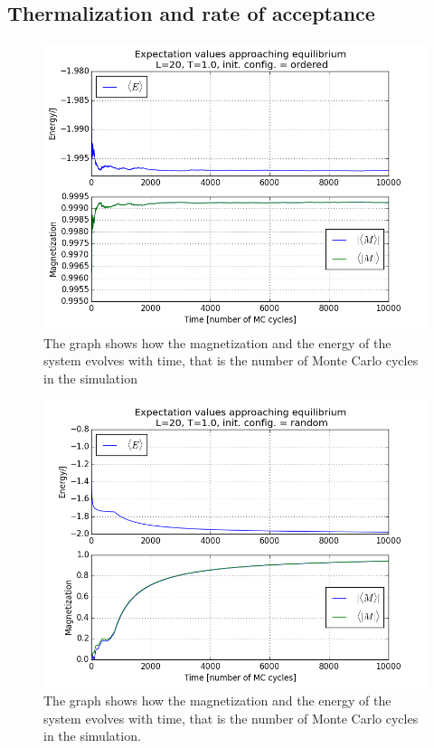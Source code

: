 \documentclass[norsk, 10pt, twocolumn, a4paper]{revtex4}
\begin{document}
\subsection{Thermalization and rate of acceptance}
\begin{figure}
    \includegraphics[width=0.9\linewidth]{c_ordered_L20t1mcE4.png}
    \caption{
        \label{fig:c1}
        The graph shows how the magnetization and the energy of the system evolves with time,
    that is the number of Monte Carlo cycles in the simulation}
\end{figure}
\begin{figure}
    \includegraphics[width=0.9\linewidth]{c_random_L20t1mcE4.png}
    \caption{
        \label{fig:c2}
        The graph shows how the magnetization and the energy of the system evolves with time,
        that is the number of Monte Carlo cycles in the simulation.}
\end{figure}
\end{document}
